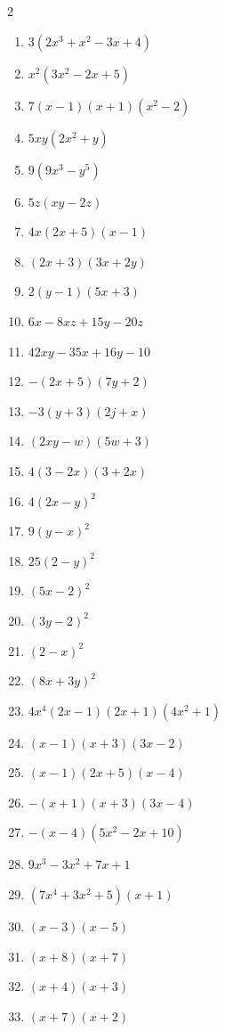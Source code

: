 \documentclass[a4paper, 12pt, parskip=half-]{scrartcl}
\begin{document}
\begin{solution}
\begin{multicols}{2}
    \begin{enumerate}
        \item $3\left(2 x^{3} + x^{2} - 3 x + 4\right)$
        \item $x^{2}\left(3 x^{2} - 2 x + 5\right)$
        \item $7 \left(x - 1\right) \left(x + 1\right) \left(x^{2} - 2\right)$
        \item $5xy\left(2x^2+y\right)$
        \item $9 (9 x^3 - y^5)$
        \item $5z(xy-2z)$
        \item $4x(2x+5)(x-1)$
        \item $(2x+3)(3x+2y)$
        \item $2(y-1)(5x+3)$
        \item $6x-8xz+15y-20z$
        \item $42xy - 35x + 16y - 10$
        \item $-(2 x + 5)(7 y + 2)$
        \item $-3(y+3)(2j+x)$
        \item $(2xy-w)(5w+3)$
        \item $4(3-2x)(3+2x)$
        \item $4(2x-y)^2$
        \item $9(y-x)^2$
        \item $25(2-y)^2$
        \item $(5x-2)^2$
        \item $(3y-2)^2$
        \item $(2-x)^2$
        \item $(8x+3y)^2$
        \item $4x^4(2x-1)(2x+1)(4x^2+1)$
        \item $(x-1)(x+3)(3x-2)$
        \item $(x-1)(2x+5)(x-4)$ 
        \item $-(x+1)(x+3)(3x-4)$
        \item $-(x-4)(5x^2-2x+10)$
        \item $9x^3-3x^2+7x+1$
        \item $\left(7x^4 + 3x^2 + 5\right)(x+1)$
        \item $(x-3)(x-5)$
        \item $(x+8)(x+7)$
        \item $(x+4)(x+3)$
        \item $(x+7)(x+2)$

\end{enumerate}
\end{multicols}
\end{solution}
\end{document}

